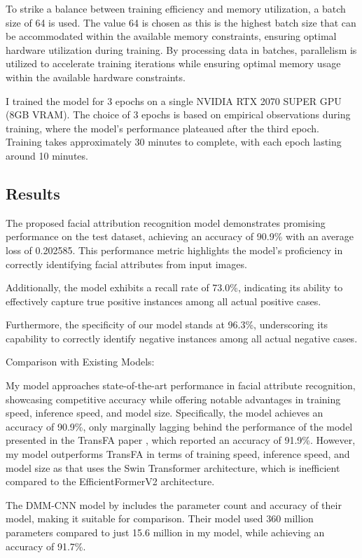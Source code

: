 \documentclass[a4paper,oneside]{article}
\begin{document}
To strike a balance between training efficiency and memory utilization, a batch size of 64 is used.
The value 64 is chosen as this is the highest batch size that can be accommodated within the available memory constraints, ensuring optimal hardware utilization during training.
By processing data in batches, parallelism is utilized to accelerate training iterations while ensuring optimal memory usage within the available hardware constraints.

I trained the model for 3 epochs on a single NVIDIA RTX 2070 SUPER GPU (8GB VRAM).
The choice of 3 epochs is based on empirical observations during training, where the model's performance plateaued after the third epoch.
Training takes approximately 30 minutes to complete, with each epoch lasting around 10 minutes.

\subsection{Results}
\label{sec:subsection_results}

The proposed facial attribution recognition model demonstrates promising performance on the test dataset, achieving an accuracy of 90.9\% with an average loss of 0.202585.
This performance metric highlights the model's proficiency in correctly identifying facial attributes from input images.

Additionally, the model exhibits a recall rate of 73.0\%, indicating its ability to effectively capture true positive instances among all actual positive cases.

Furthermore, the specificity of our model stands at 96.3\%, underscoring its capability to correctly identify negative instances among all actual negative cases.

Comparison with Existing Models:

My model approaches state-of-the-art performance in facial attribute recognition, showcasing competitive accuracy while offering notable advantages in training speed, inference speed, and model size.
Specifically, the model achieves an accuracy of 90.9\%, only marginally lagging behind the performance of the model presented in the TransFA paper \citet{liu2022transfa}, which reported an accuracy of 91.9\%.
However, my model outperforms TransFA in terms of training speed, inference speed, and model size as that uses the Swin Transformer architecture, which is inefficient compared to the EfficientFormerV2 architecture.

The DMM-CNN model by \citet{DBLP:journals/corr/abs-2002-03683} includes the parameter count and accuracy of their model, making it suitable for comparison.
Their model used 360 million parameters compared to just 15.6 million in my model, while achieving an accuracy of 91.7\%.
\end{document}
